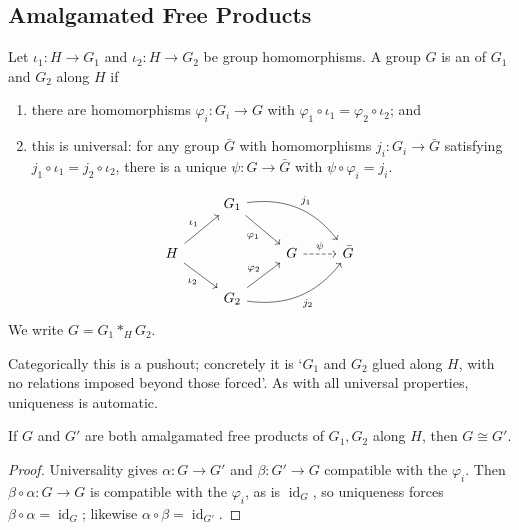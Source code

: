 \documentclass[a4paper]{scrartcl}
\newcommand{\id}{\operatorname{id}}
\begin{document}
\subsection{Amalgamated Free Products}

\begin{definition}
	Let $\iota_1: H \to G_1$ and $\iota_2: H \to G_2$ be group homomorphisms. A group $G$ is an  of $G_1$ and $G_2$ along $H$ if
	\begin{enumerate}
		\item there are homomorphisms $\varphi_i: G_i \to G$ with $\varphi_1 \circ \iota_1 = \varphi_2 \circ \iota_2$; and
		\item this is universal: for any group $\bar G$ with homomorphisms $j_i: G_i \to \bar G$ satisfying $j_1 \circ\iota_1 = j_2\circ\iota_2$, there is a unique $\psi: G \to \bar G$ with $\psi \circ \varphi_i = j_i$.
	\end{enumerate}
	\[\begin{tikzcd}
		& {G_1} \arrow[rd, "{\varphi_1}"'] \arrow[rrd, "{j_1}", bend left] & & \\
		H \arrow[ru, "{\iota_1}"] \arrow[rd, "{\iota_2}"'] & & G \arrow[r, "\psi", dashed] & {\bar G} \\
		& {G_2} \arrow[ru, "{\varphi_2}"] \arrow[rru, "{j_2}"', bend right] & &
	\end{tikzcd}\]
	We write $G = G_1 *_H G_2$.
\end{definition}

Categorically this is a pushout; concretely it is `$G_1$ and $G_2$ glued along $H$, with
no relations imposed beyond those forced'. As with all universal properties, uniqueness
is automatic.

\begin{proposition}
	If $G$ and $G'$ are both amalgamated free products of $G_1, G_2$ along $H$, then $G \cong G'$.
\end{proposition}
\begin{proof}
	Universality gives $\alpha: G \to G'$ and $\beta: G' \to G$ compatible with the $\varphi_i$. Then $\beta\circ\alpha: G \to G$ is compatible with the $\varphi_i$, as is $\id_G$, so uniqueness forces $\beta\circ\alpha = \id_G$; likewise $\alpha\circ\beta = \id_{G'}$.
\end{proof}
\end{document}
